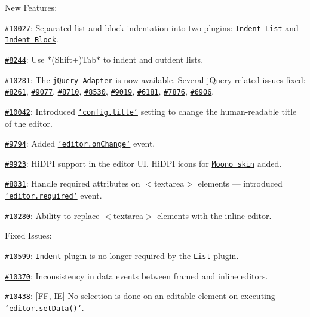 New Features\-:
\begin{DoxyItemize}
\item \href{http://dev.ckeditor.com/ticket/10027}{\tt \#10027}\-: Separated list and block indentation into two plugins\-: \href{http://ckeditor.com/addon/indentlist}{\tt Indent List} and \href{http://ckeditor.com/addon/indentblock}{\tt Indent Block}.
\item \href{http://dev.ckeditor.com/ticket/8244}{\tt \#8244}\-: Use $\ast$(Shift+)Tab$\ast$ to indent and outdent lists.
\item \href{http://dev.ckeditor.com/ticket/10281}{\tt \#10281}\-: The \href{http://docs.ckeditor.com/#!/guide/dev_jquery}{\tt j\-Query Adapter} is now available. Several j\-Query-\/related issues fixed\-: \href{http://dev.ckeditor.com/ticket/8261}{\tt \#8261}, \href{http://dev.ckeditor.com/ticket/9077}{\tt \#9077}, \href{http://dev.ckeditor.com/ticket/8710}{\tt \#8710}, \href{http://dev.ckeditor.com/ticket/8530}{\tt \#8530}, \href{http://dev.ckeditor.com/ticket/9019}{\tt \#9019}, \href{http://dev.ckeditor.com/ticket/6181}{\tt \#6181}, \href{http://dev.ckeditor.com/ticket/7876}{\tt \#7876}, \href{http://dev.ckeditor.com/ticket/6906}{\tt \#6906}.
\item \href{http://dev.ckeditor.com/ticket/10042}{\tt \#10042}\-: Introduced \href{http://docs.ckeditor.com/#!/api/CKEDITOR.config-cfg-title}{\tt `config.title`} setting to change the human-\/readable title of the editor.
\item \href{http://dev.ckeditor.com/ticket/9794}{\tt \#9794}\-: Added \href{http://docs.ckeditor.com/#!/api/CKEDITOR.editor-event-change}{\tt `editor.on\-Change`} event.
\item \href{http://dev.ckeditor.com/ticket/9923}{\tt \#9923}\-: Hi\-D\-P\-I support in the editor U\-I. Hi\-D\-P\-I icons for \href{http://ckeditor.com/addon/moono}{\tt Moono skin} added.
\item \href{http://dev.ckeditor.com/ticket/8031}{\tt \#8031}\-: Handle {\ttfamily required} attributes on {\ttfamily $<$textarea$>$} elements --- introduced \href{http://docs.ckeditor.com/#!/api/CKEDITOR.editor-event-required}{\tt `editor.required`} event.
\item \href{http://dev.ckeditor.com/ticket/10280}{\tt \#10280}\-: Ability to replace {\ttfamily $<$textarea$>$} elements with the inline editor.
\end{DoxyItemize}

Fixed Issues\-:
\begin{DoxyItemize}
\item \href{http://dev.ckeditor.com/ticket/10599}{\tt \#10599}\-: \href{http://ckeditor.com/addon/indent}{\tt Indent} plugin is no longer required by the \href{http://ckeditor.com/addon/list}{\tt List} plugin.
\item \href{http://dev.ckeditor.com/ticket/10370}{\tt \#10370}\-: Inconsistency in data events between framed and inline editors.
\item \href{http://dev.ckeditor.com/ticket/10438}{\tt \#10438}\-: \mbox{[}F\-F, I\-E\mbox{]} No selection is done on an editable element on executing \href{http://docs.ckeditor.com/#!/api/CKEDITOR.editor-method-setData}{\tt `editor.set\-Data()`}.
\end{DoxyItemize}

